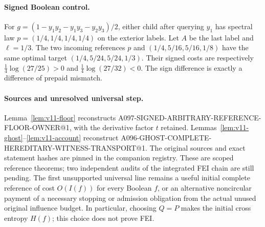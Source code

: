 \documentclass[11pt]{article}
\begin{document}
\paragraph{Signed Boolean control.}
For $g=(1-y_1y_2-y_1y_3-y_2y_3)/2$, either child after querying $y_1$ has
spectral law $p=(1/4,1/4,1/4,1/4)$ on the exterior labels.
Let $A$ be the last label and $\ell=1/3$. The two incoming references
$p$ and $(1/4,5/16,5/16,1/8)$ have the same optimal target
$(1/4,5/24,5/24,1/3)$. Their signed costs are respectively
$\frac14\log(27/25)>0$ and $\frac14\log(27/32)<0$.
The sign difference is exactly a difference of prepaid mismatch.

\paragraph{Sources and unresolved universal step.}
Lemma~\ref{lem:v11-floor} reconstructs A097-SIGNED-ARBITRARY-REFERENCE-FLOOR-OWNER@1,
with the derivative factor $t$ retained. Lemmas~\ref{lem:v11-ghost}--\ref{lem:v11-account}
reconstruct A096-GHOST-COMPLETE-HEREDITARY-WITNESS-TRANSPORT@1.
The original sources and exact statement hashes are pinned in the companion registry.
These are scoped reference theorems; two independent audits of the integrated FEI
chain are still pending. The first unsupported universal line remains a useful
initial complete reference of cost $O(I(f))$ for every Boolean $f$, or an alternative
noncircular payment of a necessary stopping or admission obligation from the actual
unused original influence budget. In particular, choosing $Q=P$ makes the initial
cross entropy $H(f)$; this choice does not prove FEI.
\end{document}
